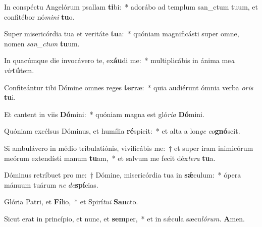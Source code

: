 \item In conspéctu Angelórum psallam \textbf{ti}bi:~* adorábo ad templum san\_ctum tuum, et confitébor nó\textit{mini} \textbf{tu}o.
\item Super misericórdia tua et veritáte \textbf{tu}a:~* quóniam magnificásti super omne, nomen \textit{san\_ctum} \textbf{tu}um.
\item In quacúmque die invocávero te, ex\textbf{áu}di me:~* multiplicábis in ánima me\tinyhspace\textit{a} \textit{vir}\textbf{tú}tem.
\item Confiteántur tibi Dómine omnes reges \textbf{ter}ræ:~* quia audiérunt ómnia verba \textit{oris} \textbf{tu}i.
\item Et cantent in viis \textbf{Dó}mini:~* quóniam magna est gló\textit{ria} \textbf{Dó}mini.
\item Quóniam excélsus Dóminus, et humília \textbf{ré}spicit:~* et alta a lon\textit{ge} \textit{co}\textbf{gnó}scit.
\item Si ambulávero in médio tribulatiónis, vivificábis me:~† et super iram inimicórum meórum extendísti manum \textbf{tu}am,~* et salvum me fecit déx\hspace*{0.01em}\textit{tera} \textbf{tu}a.
\item Dóminus retríbuet pro me:~† Dómine, misericórdia tua in \textbf{sǽ}culum:~* ópera mánuum tuárum \textit{ne} \textit{de}\textbf{spí}cias.
\item Glória Patri, et \textbf{Fí}lio,~* et Spirí\tinyhspace\textit{tui} \textbf{San}cto.
\item Sicut erat in princípio, et nunc, et \textbf{sem}per,~* et in sǽcula sæcu\tinyhspace\textit{lórum.} \textbf{A}men.